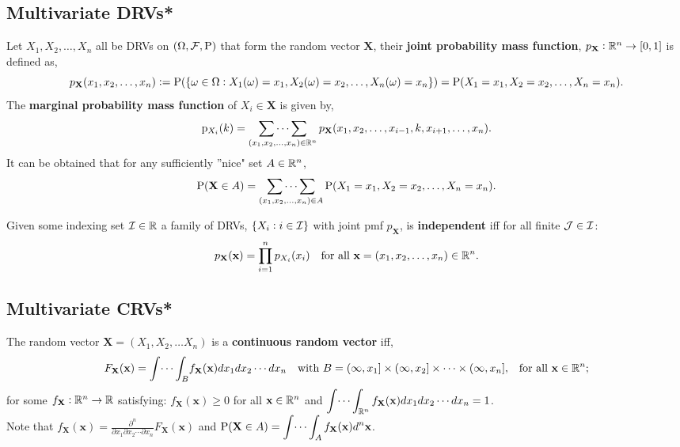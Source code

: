 \documentclass[../Year1.tex]{subfiles}
\begin{document}
\subsection{Multivariate DRVs*}
\begin{definition}
    Let $X_1,X_2,\ldots,X_n$ all be DRVs on $(\Omega,\FFF,\P)$ that form the random vector $\textbf{X}$, their \textbf{joint probability mass function}, $p_{\textbf{X}}:\RR^n\rightarrow[0,1]$ is defined as, \[
        p_{\textbf{X}}(x_1,x_2,\ldots,x_n) := 
        \P(\{\omega\in\Omega:X_1(\omega)=x_1,X_2(\omega)=x_2,\ldots,X_n(\omega)=x_n\})
        = \P(X_1=x_1,X_2=x_2,\ldots,X_n=x_n) \textcolor{black}{.}
    \]
    The \textbf{marginal probability mass function} of $X_i\in\textbf{X}$ is given by, \[
        \p_{X_i}(k)= \mathop{\sum\dots\sum}_{(x_1,x_2,\ldots,x_n)\in \RR^n} 
        p_{\textbf{X}}(x_1,x_2,\ldots,x_{i-1},k,x_{i+1},\ldots,x_n)\text{\textcolor{black}{.}}
    \]
    \begingroup\belowdisplayskip=-0pt
    It can be obtained that for any sufficiently ''nice" set $A\in\RR^n$, \[
        \P(\textbf{X}\in A) = \mathop{\sum\dots\sum}_{(x_1,x_2,\ldots,x_n)\in A}\P(X_1=x_1,X_2=x_2,\ldots,X_n=x_n)\textcolor{black}{.}
    \]
    \endgroup
\end{definition}

\begingroup\belowdisplayskip=-10pt
\begin{definition}
    Given some indexing set $\III\in\RR$ a family of DRVs, $\{X_i:i\in\III\}$ with joint pmf $p_\textbf{X}$, is \textbf{independent} iff for all finite $\JJJ\in\III$: \[
        p_{\textbf{X}}(\textbf{x}) = \prod_{i=1}^np_{X_i}(x_i) \quad \text{\textcolor{black}{for all }$\textbf{x}=(x_1,x_2,\ldots,x_n)\in\RR^n$}
    \textcolor{black}{.}\]
\end{definition}
\endgroup
\subsection{Multivariate CRVs*}

\begin{definition}
    The random vector $\textbf{X}=(X_1,X_2,\ldots X_n)$ is a \textbf{continuous random vector} iff, \[
    F_\textbf{X}(\textbf{x}) = 
    {\displaystyle\int\dots\int_{B}}
    f_{\textbf{X}} (\textbf{x})dx_1dx_2\cdots dx_n
    \quad \text{\textcolor{black}{with }$B = (\infty,x_1]\times(\infty,x_2]\times\dots\times(\infty,x_n]$}\textcolor{black}{,}
    \quad \text{\textcolor{black}{for all }$\textbf{x}\in\RR^n$}
    \textcolor{black}{;}\]
    for some $f_\textbf{X}:\RR^n\rightarrow\RR$ satisfying: $f_\textbf{X}(\textbf{x})\geq0$ for all $\textbf{x}\in\RR^n$ and ${\displaystyle\int\dots\int_{\RR^n}f_\textbf{X}(\textbf{x})dx_1dx_2\cdots dx_n}=1$.\\
    Note that $\displaystyle f_\textbf{X}(\textbf{x})=\frac{\partial^n}{\partial x_1\partial x_2\cdots\partial x_n}F_\textbf{X}(\textbf{x})$ and ${\displaystyle \P(\textbf{X}\in A)=\int\dots\int_Af_\textbf{X}(\textbf{x})d^n\textbf{x}}$.
\end{definition}
\end{document}
